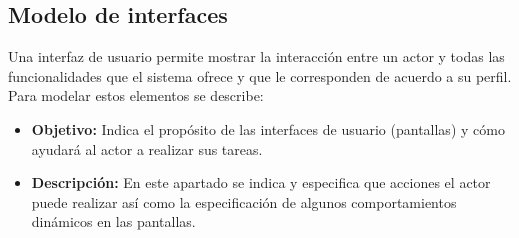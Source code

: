 %

\subsection{Modelo de interfaces}

Una interfaz de usuario permite mostrar la interacción entre un actor y todas 
las funcionalidades que el sistema ofrece y que le corresponden de acuerdo a su 
perfil. Para modelar estos elementos se describe:
\begin{itemize}
	\item \textbf{Objetivo:} Indica el propósito de las interfaces de 
	usuario (pantallas) y cómo ayudará al actor a realizar sus tareas.
	\item \textbf{Descripción:} En este apartado se indica y especifica que 
	acciones el actor puede realizar así como la especificación de algunos 
	comportamientos dinámicos en las pantallas.
\end{itemize}
